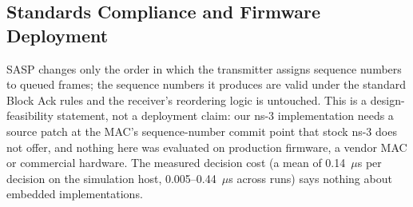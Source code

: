 \documentclass[10pt,journal,compsoc]{IEEEtran}
\begin{document}
\subsection{Standards Compliance and Firmware Deployment}
SASP changes only the order in which the transmitter assigns sequence numbers to queued frames; the sequence numbers it produces are valid under the standard Block Ack rules and the receiver's reordering logic is untouched. This is a design-feasibility statement, not a deployment claim: our ns-3 implementation needs a source patch at the MAC's sequence-number commit point that stock ns-3 does not offer, and nothing here was evaluated on production firmware, a vendor MAC or commercial hardware. The measured decision cost (a mean of 0.14~$\mu$s per decision on the simulation host, 0.005--0.44~$\mu$s across runs) says nothing about embedded implementations.
\end{document}
